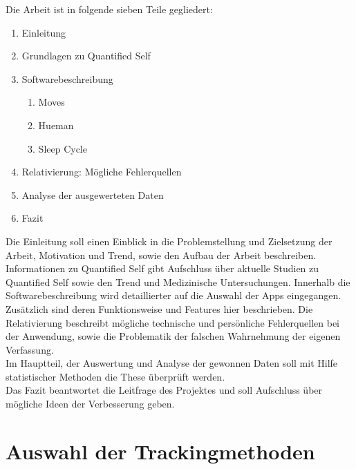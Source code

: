 Die Arbeit ist in folgende sieben Teile gegliedert:

\begin{enumerate}
\def\labelenumi{\arabic{enumi}.}
\itemsep1pt\parskip0pt
\item
  Einleitung
\item
  Grundlagen zu Quantified Self
\item
  Softwarebeschreibung

  \begin{enumerate}
  \def\labelenumii{\alph{enumii}.}
  \itemsep1pt\parskip0pt
  \item
    Moves
  \item
    Hueman
  \item
    Sleep Cycle
  \end{enumerate}
\item
  Relativierung: Mögliche Fehlerquellen
\item
  Analyse der ausgewerteten Daten
\item
  Fazit
\end{enumerate}

Die Einleitung soll einen Einblick in die Problemstellung und Zielsetzung der Arbeit, Motivation und Trend, sowie den Aufbau der Arbeit beschreiben.
Informationen zu Quantified Self gibt Aufschluss über aktuelle Studien zu Quantified Self sowie den Trend und Medizinische Untersuchungen.
Innerhalb die Softwarebeschreibung wird detaillierter auf die Auswahl der Apps eingegangen.\\
Zusätzlich sind deren Funktionsweise und Features hier beschrieben.
Die Relativierung beschreibt mögliche technische und persönliche Fehlerquellen bei der Anwendung, sowie die Problematik der falschen Wahrnehmung der eigenen Verfassung.
\\
Im Hauptteil, der Auswertung und Analyse der gewonnen Daten soll mit Hilfe statistischer Methoden die These überprüft werden.
\\
Das Fazit beantwortet die Leitfrage des Projektes und soll Aufschluss über mögliche Ideen der Verbesserung geben.

\section{Auswahl der Trackingmethoden}
\label{ch:Einleitung:sec:AuswahlDerTrackingmethoden}

